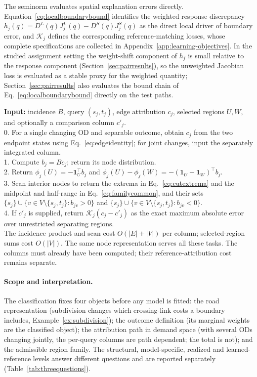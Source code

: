 \documentclass[a4paper,fleqn]{cas-sc}
\begin{document}
The seminorm evaluates spatial explanation errors directly.
Equation~\eqref{eq:localboundarybound} identifies the weighted response
discrepancy $h_j(q)=D^L(q)J_j^L(q)-D^S(q)J_j^S(q)$ as the direct local
driver of boundary error, and $\mathcal K_j$ defines the corresponding
reference-matching losses, whose complete specifications are collected
in Appendix~\ref{app:learning-objectives}. In the studied assignment
setting the weight-shift component of $h_j$ is small relative to the
response component (Section~\ref{sec:pairresults}), so the unweighted
Jacobian loss is evaluated as a stable proxy for the weighted quantity;
Section~\ref{sec:pairresults} also evaluates the bound chain of
Eq.~\eqref{eq:localboundarybound} directly on the test paths.

\begin{algo}[t]
\caption{From an edge attribution to a spatial explanation}\label{alg:spatial}
\small
\textbf{Input:} incidence $B$, query $(s_j,t_j)$, edge attribution $c_j$,
selected regions $U,W$, and optionally a comparison column $c'_j$.\\
0. For a single changing OD and separable outcome, obtain $c_j$ from the two endpoint states using Eq.~\eqref{eq:edgeidentity}; for joint changes, input the separately integrated column.\\
1. Compute $b_j=Bc_j$; return its node distribution.\\
2. Return $\phi_j(U)=-\mathbf1_U^\top b_j$ and
$\phi_j(U)-\phi_j(W)=-(\mathbf1_U-\mathbf1_W)^\top b_j$.\\
3. Scan interior nodes to return the extrema in Eq.~\eqref{eq:cutextrema}
and the midpoint and half-range in Eq.~\eqref{eq:familycommon},
and their sets $\{s_j\}\cup\{v\in V\setminus\{s_j,t_j\}:b_{jv}>0\}$ and
$\{s_j\}\cup\{v\in V\setminus\{s_j,t_j\}:b_{jv}<0\}$.\\
4. If $c'_j$ is supplied, return $\mathcal K_j(c_j-c'_j)$ as the exact
maximum absolute error over unrestricted separating regions.\\
The incidence product and scan cost $O(|E|+|V|)$ per column; selected-region
sums cost $O(|V|)$. The same node representation serves all these tasks. The columns must already
have been computed; their reference-attribution cost remains separate.
\end{algo}



\paragraph{Scope and interpretation.}\label{sec:noninheritance}
The classification fixes four objects before any model is fitted: the
road representation (subdivision changes which crossing-link costs a
boundary includes, Example~\ref{ex:subdivision}); the outcome
definition (its marginal weights are the classified object); the
attribution path in demand space (with several ODs changing jointly,
the per-query columns are path dependent; the total is not); and the
admissible region family. The structural, model-specific, realized and
learned-reference levels answer different questions and are reported
separately (Table~\ref{tab:threequestions}).
\end{document}
